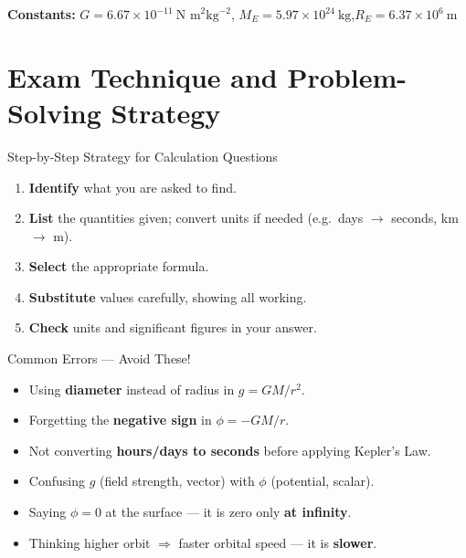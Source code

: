 \documentclass[12pt,a4paper]{article}
\begin{document}
\vspace{0.5em}
\begin{tcolorbox}[colback=lightblue, colframe=darkblue]
\textbf{Constants:} $G = 6.67\times10^{-11}\ \text{N m}^2\text{kg}^{-2}$,\quad
$M_E = 5.97\times10^{24}\ \text{kg}$,\quad $R_E = 6.37\times10^6\ \text{m}$
\end{tcolorbox}

\section{Exam Technique and Problem-Solving Strategy}

\begin{keybox}{Step-by-Step Strategy for Calculation Questions}
\begin{enumerate}[itemsep=3pt]
  \item \textbf{Identify} what you are asked to find.
  \item \textbf{List} the quantities given; convert units if needed (e.g.\ days $\to$ seconds, km $\to$ m).
  \item \textbf{Select} the appropriate formula.
  \item \textbf{Substitute} values carefully, showing all working.
  \item \textbf{Check} units and significant figures in your answer.
\end{enumerate}
\end{keybox}

\begin{warningbox}{Common Errors — Avoid These!}
\begin{itemize}[itemsep=3pt]
  \item Using \textbf{diameter} instead of radius in $g = GM/r^2$.
  \item Forgetting the \textbf{negative sign} in $\phi = -GM/r$.
  \item Not converting \textbf{hours/days to seconds} before applying Kepler's Law.
  \item Confusing \textbf{$g$} (field strength, vector) with \textbf{$\phi$} (potential, scalar).
  \item Saying $\phi = 0$ at the surface — it is zero only \textbf{at infinity}.
  \item Thinking higher orbit $\Rightarrow$ faster orbital speed — it is \textbf{slower}.
\end{itemize}
\end{warningbox}
\end{document}
